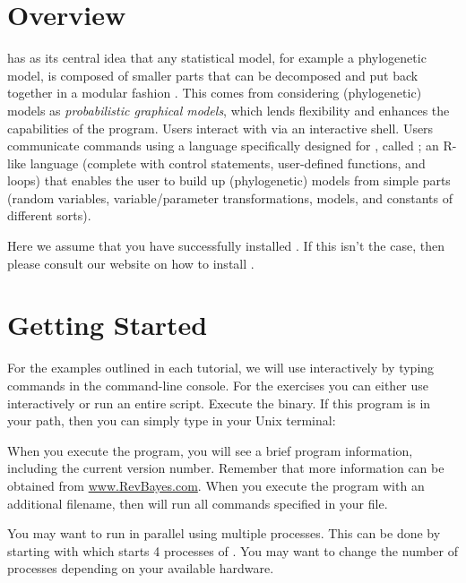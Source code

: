 
\section{Overview}

\RevBayes has as its central idea that any statistical model, for example a phylogenetic model, is composed of smaller parts that can be decomposed and put back together in a modular fashion \citep{Hoehna2016b}. 
This comes from considering (phylogenetic) models as \textit{probabilistic graphical models}, which lends flexibility and enhances the capabilities of the program. 
Users interact with \RevBayes via an interactive shell.
Users communicate commands using a language specifically designed for \RevBayes, called \Rev; an R-like language (complete with control statements, user-defined functions, and loops) that enables the user to build up (phylogenetic) models from simple parts (random variables, variable/parameter transformations, models, and constants of different sorts).
 
Here we assume that you have successfully installed \RevBayes.
If this isn't the case, then please consult our website on how to install \RevBayes.



\bigskip
\section{Getting Started}

For the examples outlined in each tutorial, we will use \RevBayes interactively by typing commands in the command-line console.
For the exercises you can either use \RevBayes interactively or run an entire script.
Execute the \RevBayes binary. If this program is in your path, then you can simply type in your Unix terminal:


When you execute the program, you will see a brief program information, including the current version number. 
Remember that more information can be obtained from \href{www.RevBayes.com}{www.RevBayes.com}.
When you execute the program with an additional filename, \EG
{}
then \RevBayes will run all commands specified in your file.

You may want to run \RevBayes in parallel using multiple processes.
This can be done by starting \RevBayes with
which starts 4 processes of \RevBayes.
You may want to change the number of processes depending on your available hardware.

